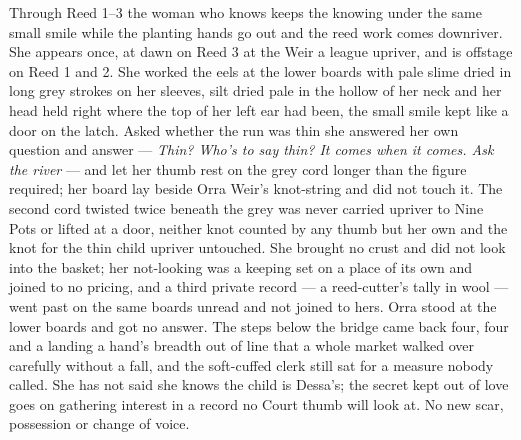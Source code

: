 \documentclass{design/chronicle}
\begin{document}
{Through Reed 1–3 the woman who knows keeps the knowing under the same small smile while the planting hands go out and the reed work comes downriver. She appears once, at dawn on Reed 3 at the Weir a league upriver, and is offstage on Reed 1 and 2. She worked the eels at the lower boards with pale slime dried in long grey strokes on her sleeves, silt dried pale in the hollow of her neck and her head held right where the top of her left ear had been, the small smile kept like a door on the latch. Asked whether the run was thin she answered her own question and answer — \emph{Thin? Who’s to say thin? It comes when it comes. Ask the river} — and let her thumb rest on the grey cord longer than the figure required; her board lay beside Orra Weir’s knot-string and did not touch it. The second cord twisted twice beneath the grey was never carried upriver to Nine Pots or lifted at a door, neither knot counted by any thumb but her own and the knot for the thin child upriver untouched. She brought no crust and did not look into the basket; her not-looking was a keeping set on a place of its own and joined to no pricing, and a third private record — a reed-cutter’s tally in wool — went past on the same boards unread and not joined to hers. Orra stood at the lower boards and got no answer. The steps below the bridge came back four, four and a landing a hand’s breadth out of line that a whole market walked over carefully without a fall, and the soft-cuffed clerk still sat for a measure nobody called. She has not said she knows the child is Dessa’s; the secret kept out of love goes on gathering interest in a record no Court thumb will look at. No new scar, possession or change of voice.

}
\end{document}

